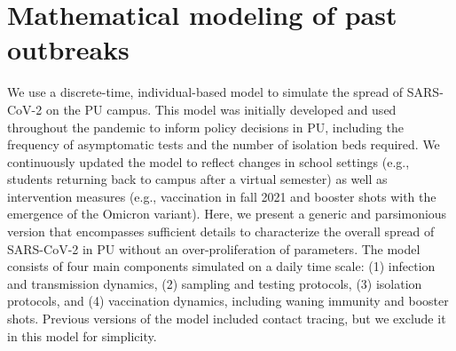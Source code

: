 \documentclass[12pt]{article}
\newcommand{\fref}[1]{Fig.~\ref{fig:#1}}
\begin{document}

\section*{Mathematical modeling of past outbreaks}

We use a discrete-time, individual-based model to simulate the spread of SARS-CoV-2 on the PU campus.
This model was initially developed and used throughout the pandemic to inform policy decisions in PU, including the frequency of asymptomatic tests and the number of isolation beds required.
We continuously updated the model to reflect changes in school settings (e.g., students returning back to campus after a virtual semester) as well as intervention measures (e.g., vaccination in fall 2021 and booster shots with the emergence of the Omicron variant).
Here, we present a generic and parsimonious version that encompasses sufficient details to characterize the overall spread of SARS-CoV-2 in PU without an over-proliferation of parameters.
The model consists of four main components simulated on a daily time scale: (1) infection and transmission dynamics, (2) sampling and testing protocols, (3) isolation protocols, and (4) vaccination dynamics, including waning immunity and booster shots.
Previous versions of the model included contact tracing, but we exclude it in this model for simplicity.
\end{document}
